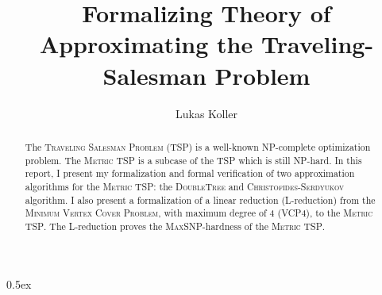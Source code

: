 \documentclass[11pt,a4paper]{article}
\begin{document}
\title{Formalizing Theory of Approximating the Traveling-Salesman Problem}
\author{Lukas Koller}
\maketitle

\begin{abstract}
  The \textsc{Traveling Salesman Problem} (\textsc{TSP}) is a well-known \textsc{NP}-complete optimization problem. The \textsc{Metric TSP} is a subcase of the \textsc{TSP} which is still \textsc{NP}-hard. In this report, I present my formalization and formal verification of two approximation algorithms for the \textsc{Metric TSP}: the \textsc{DoubleTree} and \textsc{Christofides-Serdyukov} algorithm. I also present a formalization of a linear reduction (L-reduction) from the \textsc{Minimum Vertex Cover Problem}, with maximum degree of 4 (\textsc{VCP4}), to the \textsc{Metric TSP}. The L-reduction proves the \textsc{MaxSNP}-hardness of the \textsc{Metric TSP}.
\end{abstract}

\tableofcontents

\parindent 0pt\parskip 0.5ex





\end{document}
